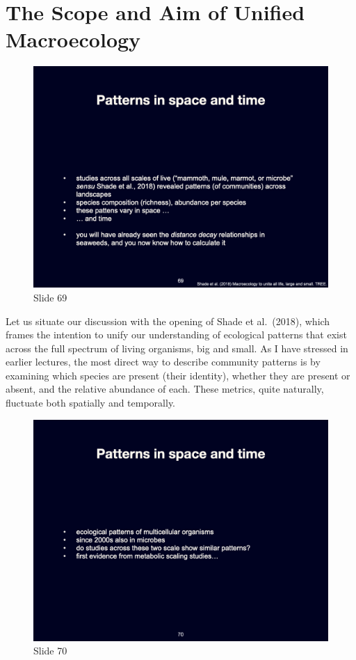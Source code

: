 \documentclass[
  10pt,
]{book}
\begin{document}
\section{The Scope and Aim of Unified
Macroecology}\label{the-scope-and-aim-of-unified-macroecology}

\begin{figure}[ht]
\centering
\includegraphics[width=0.8\linewidth]{../images/BDC334/BDC334-069.jpeg}
\caption*{Slide 69}
\end{figure}

Let us situate our discussion with the opening of Shade et al.~(2018),
which frames the intention to unify our understanding of ecological
patterns that exist across the full spectrum of living organisms, big
and small. As I have stressed in earlier lectures, the most direct way
to describe community patterns is by examining which species are present
(their identity), whether they are present or absent, and the relative
abundance of each. These metrics, quite naturally, fluctuate both
spatially and temporally.

\begin{figure}[ht]
\centering
\includegraphics[width=0.8\linewidth]{../images/BDC334/BDC334-070.jpeg}
\caption*{Slide 70}
\end{figure}
\end{document}
